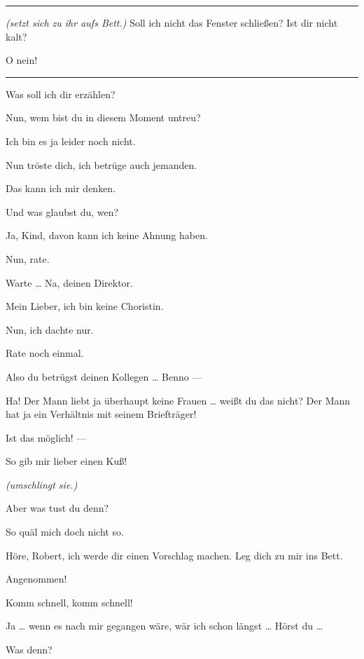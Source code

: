 \documentclass[
	final,
	a4paper,
	ngerman,
	mpinclude = true, %
	twoside = true,
	open = right,
	cleardoublepage = plain,
	DIV = 13,
	BCOR = 1cm,
	titlepage = firstiscover,
	]{scrbook}
\newcommand{\marginnote}[1]{\marginpar{\singlespacing\raggedright\footnotesize#1}}
\newcommand{\direction}[1]{\textit{(#1)}}
\newenvironment{deletion}{%
		\vspace{0.25\baselineskip}
		\hrule
		\vspace{0.25\baselineskip}
		\color{darkgray}
	}{
		\color{black}
		\vspace{0.25\baselineskip}
		\hrule 
		\vspace{0.25\baselineskip}
	}
\newcommand{\thecharacter}[1]{\textup{\textsc{#1}}\xspace}
\newcommand{\thedichter}{\thecharacter{Robert Bibitz}}
\newcommand{\theschauspielerin}{\thecharacter{Daniela}}
\newcommand{\character}[1]{\item[#1:]}
\newcommand{\dichter}{\character{\thedichter}}
\newcommand{\schauspielerin}{\character{\theschauspielerin}}
\begin{document}
\begin{play}
	\begin{deletion}
	\dichter
	\direction{setzt sich zu ihr aufs Bett.} Soll ich nicht das Fenster schließen? Ist dir nicht kalt?

	\schauspielerin
	O nein!
	\end{deletion}

	\dichter
	Was soll ich dir erzählen?

	\schauspielerin
	Nun, wem bist du in diesem Moment untreu?

	\dichter
	Ich bin es ja leider noch nicht.

	\schauspielerin
	Nun tröste dich, ich betrüge auch jemanden.

	\dichter
	Das kann ich mir denken.

	\schauspielerin
	Und was glaubst du, wen?

	\dichter
	Ja, Kind, davon kann ich keine Ahnung haben.

	\schauspielerin
	Nun, rate.

	\dichter
	Warte \ldots{} Na, deinen Direktor.

	\schauspielerin
	Mein Lieber, ich bin keine Choristin.

	\dichter
	Nun, ich dachte nur.

	\schauspielerin
	Rate noch einmal.

	\dichter
	Also du betrügst deinen Kollegen \ldots{} Benno ---

	\schauspielerin
	Ha! Der Mann liebt ja überhaupt keine Frauen \ldots{} weißt du das nicht? Der Mann hat ja ein Verhältnis mit seinem Briefträger!

	\dichter
	Ist das möglich! ---

	\schauspielerin
	So gib mir lieber einen Kuß!

	\dichter
	\direction{umschlingt sie.}

	\schauspielerin
	Aber was tust du denn?

	\dichter
	So quäl mich doch nicht so.

	\schauspielerin
	Höre, Robert, ich werde dir einen Vorschlag machen. Leg dich zu mir ins Bett.

	\dichter
	Angenommen!

	\schauspielerin
	Komm schnell, komm schnell!

	\marginnote{\enquote{schon passiert\ldots{}}}
	\dichter
	Ja \ldots{} wenn es nach mir gegangen wäre, wär ich schon längst \ldots{} Hörst du \ldots{}

	\schauspielerin
	Was denn?


\end{play}
\end{document}

